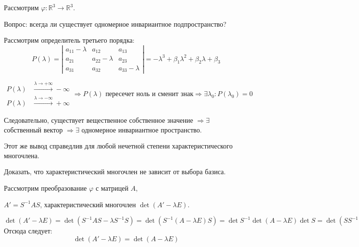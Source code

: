 \begin{prim}
Рассмотрим $\varphi:\mathbb{R}^3 \rightarrow \mathbb{R}^3$.

Вопрос: всегда ли существует одномерное инвариантное подпространство?
\end{prim}
Рассмотрим определитель третьего порядка:
$$P(\lambda)=\left| \begin{array}{ccc}
a_{11}- \lambda & a_{12} & a_{13}  \\
a_{21} & a_{22} -\lambda& a_{23}\\
a_{31}&a_{32}&a_{33}-\lambda
\end{array}\right| = -\lambda^3 + \beta_1\lambda^2 +\beta_2\lambda+\beta_3$$

$\begin{aligned}
P(\lambda) &\xrightarrow{\lambda \rightarrow +\infty} -\infty\\
P(\lambda) &\xrightarrow{\lambda \rightarrow -\infty} +\infty
\end{aligned} \Rightarrow P(\lambda)\text{ пересечет ноль и сменит знак} \Rightarrow \exists \lambda_0:P(\lambda_0)=0$

Следовательно, существует вещественное собственное значение $\Rightarrow \exists$ собственный вектор $\Rightarrow \exists$ одномерное инвариантное пространство.

Этот же вывод справедлив для любой нечетной степени характеристического многочлена.
\begin{prim}
Доказать, что характеристический многочлен не зависит от выбора базиса.
\end{prim}
Рассмотрим преобразование $\varphi$ с матрицей $A$,

$A'=S^{-1}AS$, характеристический многочлен $\det(A'-\lambda E)$.

$\det(A'-\lambda E) = \det(S^{-1}AS -\lambda S^{-1}S)= \det(S^{-1}(A-\lambda E)S)=\det S^{-1}\det(A-\lambda E)\det S=\det(SS^{-1})\det(A-\lambda E)=\det(A-\lambda E).$\\
Отсюда следует:
$$
\det(A'-\lambda E)=\det(A-\lambda E)
$$